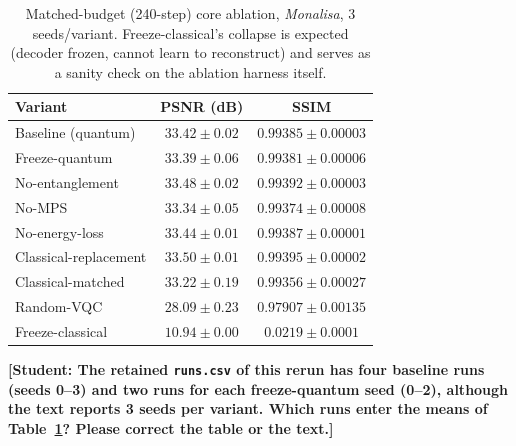 \documentclass[11pt]{article}
\begin{document}
\begin{table}[H]
\centering
\caption{Matched-budget (240-step) core ablation, \textit{Monalisa}, 3 seeds/variant. Freeze-classical's collapse is expected (decoder frozen, cannot learn to reconstruct) and serves as a sanity check on the ablation harness itself.}
\label{tab:core_multiseed_240}
\scriptsize
\begin{tabular}{lcc}
\toprule
Variant & PSNR (dB) & SSIM \\
\midrule
Baseline (quantum) & $33.42\pm0.02$ & $0.99385\pm0.00003$ \\
Freeze-quantum & $33.39\pm0.06$ & $0.99381\pm0.00006$ \\
No-entanglement & $33.48\pm0.02$ & $0.99392\pm0.00003$ \\
No-MPS & $33.34\pm0.05$ & $0.99374\pm0.00008$ \\
No-energy-loss & $33.44\pm0.01$ & $0.99387\pm0.00001$ \\
Classical-replacement & $33.50\pm0.01$ & $0.99395\pm0.00002$ \\
Classical-matched & $33.22\pm0.19$ & $0.99356\pm0.00027$ \\
Random-VQC & $28.09\pm0.23$ & $0.97907\pm0.00135$ \\
Freeze-classical & $10.94\pm0.00$ & $0.0219\pm0.0001$ \\
\bottomrule
\end{tabular}
\end{table}

{\color{red}\textbf{[Student: The retained \texttt{runs.csv} of this rerun has four baseline runs (seeds 0--3) and two runs for each freeze-quantum seed (0--2), although the text reports 3 seeds per variant. Which runs enter the means of Table~\ref{tab:core_multiseed_240}? Please correct the table or the text.]}}
\end{document}
